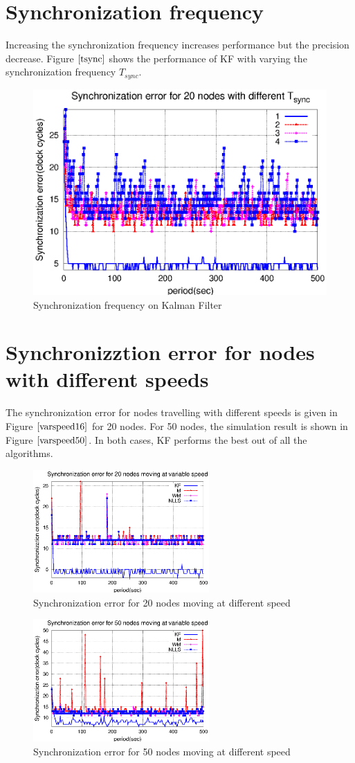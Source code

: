 \documentclass[a4paper,10pt]{report}
\begin{document}
\section{Synchronization frequency}
Increasing the synchronization frequency increases performance but the precision decrease. Figure $\ref{tsync}$ shows the performance of KF with varying the synchronization frequency $T_{sync}$.
\begin{figure}[!h]
\centering
\includegraphics[width= 0.7 \textwidth]{tsync}
\caption{Synchronization frequency on Kalman Filter} \label{tsync}
\end{figure}
\section{Synchronizztion error for nodes with different speeds}
The synchronization error for nodes travelling with different speeds is given in Figure $\ref{varspeed16}$ for 20 nodes. For 50 nodes, the simulation result is shown in Figure $\ref{varspeed50}$. In both cases, KF performs the best out of all the algorithms.
\begin{figure}
 \centering
 \includegraphics[width=0.6\textwidth]{varspeed20}
 \caption{Synchronization error for 20 nodes moving at different speed}
 \label{varspeed16}
\end{figure}
\begin{figure}
 \centering
 \includegraphics[width=0.6\textwidth]{varspeed50}
 \caption{Synchronization error for 50 nodes moving at different speed}
 \label{varspeed50}
\end{figure}
\end{document}
